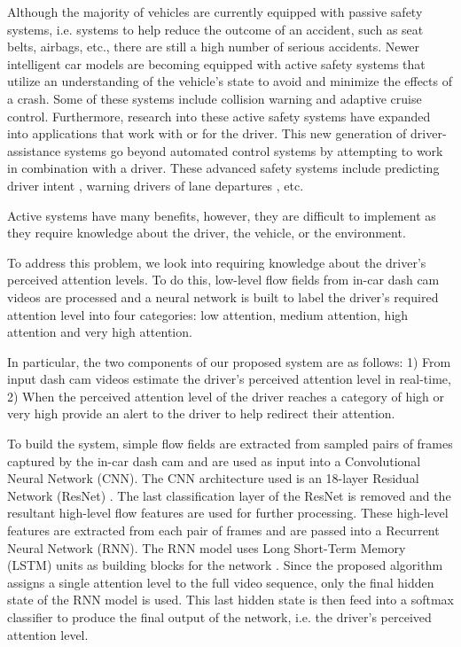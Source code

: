 \documentclass[10pt, conference, compsocconf]{IEEEtran}
\begin{document}
Although the majority of vehicles are currently equipped with passive safety systems, i.e. systems to help reduce the outcome of an accident, such as seat belts, airbags, etc., there are still a high number of serious accidents. Newer intelligent car models are becoming equipped with active safety systems that utilize an understanding of the vehicle's state to avoid and minimize the effects of a crash. Some of these systems include collision warning and adaptive cruise control. Furthermore, research into these active safety systems have expanded into applications that work with or for the driver. This new generation of driver-assistance systems go beyond automated control systems by attempting to work in combination with a driver. These advanced safety systems include predicting driver intent \cite{doi:10.1177/154193120404801905}, warning drivers of lane departures \cite{ROB:ROB10056}, etc.

Active systems have many benefits, however, they are difficult to implement as they require knowledge about the driver, the vehicle, or the environment.

To address this problem, we look into requiring knowledge about the driver's perceived attention levels. To do this, low-level flow fields from in-car dash cam videos are processed and a neural network is built to label the driver's required attention level into four categories: low attention, medium attention, high attention and very high attention.

In particular, the two components of our proposed system are as follows: 1) From input dash cam videos estimate the driver's perceived attention level in real-time, 2) When the perceived attention level of the driver reaches a category of high or very high provide an alert to the driver to help redirect their attention.

To build the system, simple flow fields are extracted from sampled pairs of frames captured by the in-car dash cam and are used as input into a Convolutional Neural Network (CNN). The CNN architecture used is an 18-layer Residual Network (ResNet) \cite{DBLP:journals/corr/HeZRS15}. The last classification layer of the ResNet is removed and the resultant high-level flow features are used for further processing. These high-level features are extracted from each pair of frames and are passed into a Recurrent Neural Network (RNN). The RNN model uses Long Short-Term Memory (LSTM) units as building blocks for the network \cite{Hochreiter:1997:LSM:1246443.1246450}. Since the proposed algorithm assigns a single attention level to the full video sequence, only the final hidden state of the RNN model is used. This last hidden state is then feed into a softmax classifier to produce the final output of the network, i.e. the driver's perceived attention level.
\end{document}
